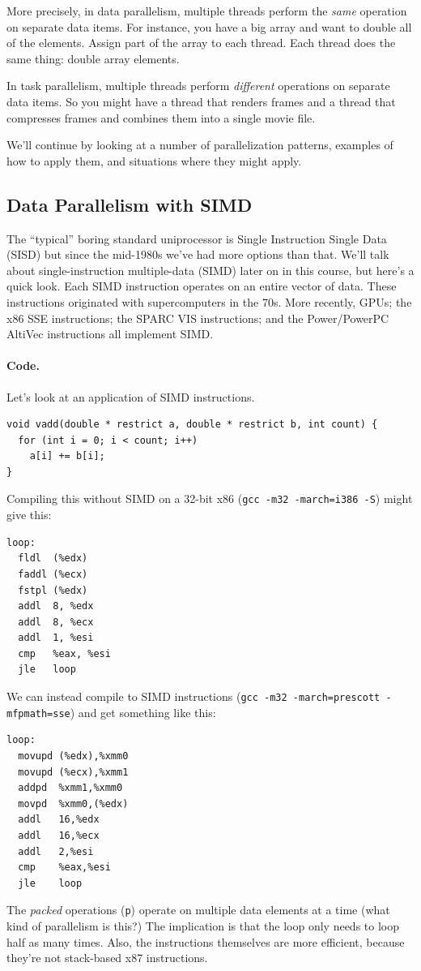 \documentclass[a4paper]{report}
\begin{document}
More precisely, in data parallelism, multiple threads perform the
\emph{same} operation on separate data items. For instance, you have a
big array and want to double all of the elements. Assign part of the
array to each thread. Each thread does the same thing: double array
elements.

In task parallelism, multiple threads perform \emph{different}
operations on separate data items. So you might have a thread that
renders frames and a thread that compresses frames and combines them
into a single movie file.

We'll continue by looking at a number of parallelization patterns,
examples of how to apply them, and situations where they might apply.

\subsection*{Data Parallelism with SIMD}
The ``typical'' boring standard uniprocessor is Single Instruction Single Data (SISD) but since the mid-1980s we've had more options than that. We'll talk about single-instruction multiple-data (SIMD) later on in
this course, but here's a quick look. Each SIMD
instruction operates on an entire vector of data. These instructions
originated with supercomputers in the 70s. More recently, GPUs; the
x86 SSE instructions; the SPARC VIS instructions; and the
Power/PowerPC AltiVec instructions all implement SIMD.

\paragraph{Code.} Let's look at an application of SIMD instructions.

\begin{verbatim}
void vadd(double * restrict a, double * restrict b, int count) {
  for (int i = 0; i < count; i++)
    a[i] += b[i];
}
\end{verbatim}

Compiling this without SIMD on a 32-bit x86 ({\tt gcc -m32 -march=i386 -S}) might give this:
\begin{verbatim}
loop:
  fldl  (%edx)
  faddl (%ecx)
  fstpl (%edx)
  addl  8, %edx
  addl  8, %ecx
  addl  1, %esi
  cmp   %eax, %esi
  jle   loop
\end{verbatim}

We can instead compile to SIMD instructions ({\tt gcc -m32 -march=prescott -mfpmath=sse})
and get something like this:
\begin{verbatim}
loop:
  movupd (%edx),%xmm0
  movupd (%ecx),%xmm1
  addpd  %xmm1,%xmm0
  movpd  %xmm0,(%edx)
  addl   16,%edx
  addl   16,%ecx
  addl   2,%esi
  cmp    %eax,%esi
  jle    loop
\end{verbatim}
The \emph{packed} operations ({\tt p}) operate on multiple data
elements at a time (what kind of parallelism is this?)
The implication is that the loop only needs to loop half as many times.
Also, the instructions themselves are more efficient, because they're
not stack-based x87 instructions.
\end{document}

